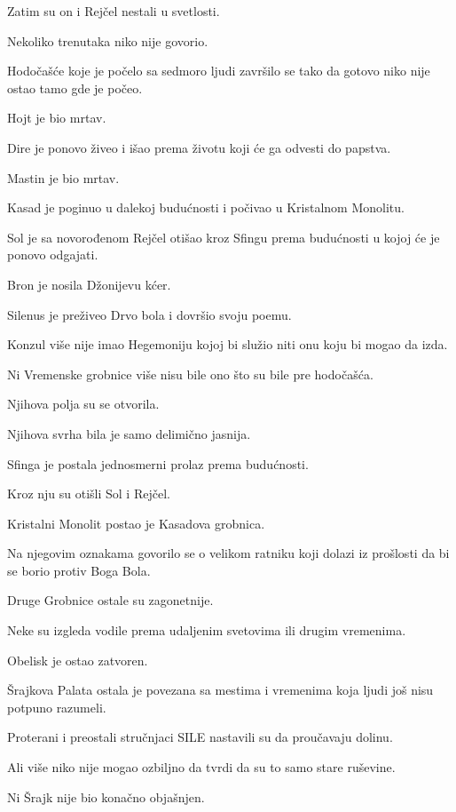 Zatim su on i Rejčel nestali u svetlosti.

\bigskip

Nekoliko trenutaka niko nije govorio.

Hodočašće koje je počelo sa sedmoro ljudi završilo se tako da gotovo niko nije ostao tamo gde je počeo.

Hojt je bio mrtav.

Dire je ponovo živeo i išao prema životu koji će ga odvesti do papstva.

Mastin je bio mrtav.

Kasad je poginuo u dalekoj budućnosti i počivao u Kristalnom Monolitu.

Sol je sa novorođenom Rejčel otišao kroz Sfingu prema budućnosti u kojoj će je ponovo odgajati.

Bron je nosila Džonijevu kćer.

Silenus je preživeo Drvo bola i dovršio svoju poemu.

Konzul više nije imao Hegemoniju kojoj bi služio niti onu koju bi mogao da izda.

\bigskip

Ni Vremenske grobnice više nisu bile ono što su bile pre hodočašća.

Njihova polja su se otvorila.

Njihova svrha bila je samo delimično jasnija.

Sfinga je postala jednosmerni prolaz prema budućnosti.

Kroz nju su otišli Sol i Rejčel.

Kristalni Monolit postao je Kasadova grobnica.

Na njegovim oznakama govorilo se o velikom ratniku koji dolazi iz prošlosti da bi se borio protiv Boga Bola.

\bigskip

Druge Grobnice ostale su zagonetnije.

Neke su izgleda vodile prema udaljenim svetovima ili drugim vremenima.

Obelisk je ostao zatvoren.

Šrajkova Palata ostala je povezana sa mestima i vremenima koja ljudi još nisu potpuno razumeli.

Proterani i preostali stručnjaci SILE nastavili su da proučavaju dolinu.

Ali više niko nije mogao ozbiljno da tvrdi da su to samo stare ruševine.

\bigskip

Ni Šrajk nije bio konačno objašnjen.

